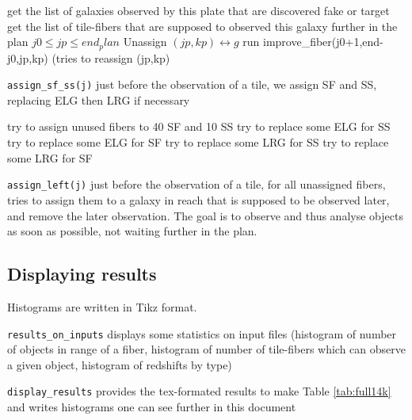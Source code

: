 \documentclass{article}
\begin{document}
\begin{algorithm}[H]
	\caption{Update\_plan\_from\_one\_observation(j0,end\_plan)}\label{euclid}
	\begin{algorithmic}[1]
		\State get the list of galaxies observed by this plate that are discovered fake or target
		\State get the list of tile-fibers that are supposed to observed this galaxy further in the plan $j0\le jp \le end_plan$
		\State Unassign $(jp,kp) \longleftrightarrow g$
		\State run improve\_fiber(j0+1,end-j0,jp,kp) (tries to reassign (jp,kp)
		\EndFor
		\EndFor
	\end{algorithmic}
\end{algorithm}

{\tt assign\_sf\_ss(j)} just before the observation of a tile, we assign SF and SS, replacing ELG then LRG if necessary

\begin{algorithm}[H]
	\caption{assign\_sf\_ss}\label{assignsfss}
	\begin{algorithmic}[1]
		\State try to assign unused fibers to 40 SF and 10 SS
		\State try to replace some ELG for SS
		\State try to replace some ELG for SF
		\EndIf
		\State try to replace some LRG for SS
		\State try to replace some LRG for SF
		\EndIf
		\EndFor
	\end{algorithmic}
\end{algorithm}

{\tt assign\_left(j)} just before the observation of a tile, for all unassigned fibers, tries to assign them to a galaxy in reach that is supposed to be observed later, and remove the later observation. The goal is to observe and thus analyse objects as soon as possible, not waiting further in the plan.


\subsection{Displaying results}
Histograms are written in Tikz format.

{\tt results\_on\_inputs} displays some statistics on input files (histogram of number of objects in range of a fiber, histogram of number of tile-fibers which can observe a given object, histogram of redshifts by type)

{\tt display\_results} provides the tex-formated results to make Table \ref{tab:full14k} and writes histograms one can see further in this document
\end{document}
